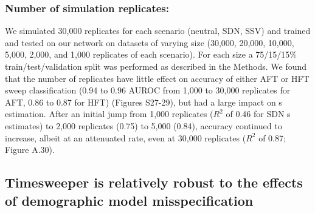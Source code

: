 \subsubsection{Number of simulation replicates:} We simulated 30,000 replicates for each scenario (neutral, SDN, SSV) and trained and tested on our network on datasets of varying size (30,000, 20,000, 10,000, 5,000, 2,000, and 1,000 replicates of each scenario). For each size a 75/15/15\% train/test/validation split was performed as described in the Methods. We found that the number of replicates have little effect on accuracy of either AFT or HFT sweep classification (0.94 to 0.96 AUROC from 1,000 to 30,000 replicates for AFT, 0.86 to 0.87 for HFT) (Figures S27-29), but had a large impact on s estimation. After an initial jump from 1,000 replicates ($R^2$ of 0.46 for SDN s estimates) to 2,000 replicates (0.75) to 5,000 (0.84), accuracy continued to increase, albeit at an attenuated rate, even at 30,000 replicates ($R^2$ of 0.87; Figure A.30). \\

\subsection{Timesweeper is relatively robust to the effects of demographic model misspecification}

